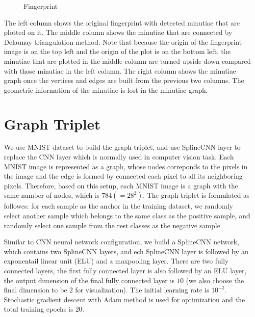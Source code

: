 \documentclass[12pt, a4paper]{article}
\begin{document}
\begin{spacing}{1}
\begin{figure}[!ht]
\begin{minipage}[b]{0.93\linewidth}
{\begin{minipage}[b]{0.27\linewidth}
                \end{minipage}
            }
        \end{minipage}
        \vfill
        \caption{Fingerprint}
        \label{fig:mnt}
    \end{figure}

    The left column shows the original fingerprint with detected minutiae that are plotted on it. The middle column shows the minutiae that are connected by Delaunay triangulation method. Note that because the origin of the fingerprint image is on the top left and the origin of the plot is on the bottom left, the minutiae that are plotted in the middle column are turned upside down compared with those minutiae in the left column. The right column shows the minutiae graph once the vertices and edges are built from the previous two columns. The geometric information of the minutiae is lost in the minutiae graph. 

    \section{Graph Triplet}
    We use MNIST dataset \cite{LecunIEEE1998} to build the graph triplet, and use SplineCNN layer \cite{FeyCVPR2018splinecnn} \cite{FeyICLR2020DGMC} to replace the CNN layer which is normally used in computer vision task. Each MNIST image is represented as a graph, whose nodes correponds to the pixels in the image and the edge is formed by connected each pixel to all its neighboring pixels. Therefore, based on this setup, each MNIST image is a graph with the same number of nodes, which is $784(=28^2)$. The graph triplet is formulated as followes: for each sample as the anchor in the training dataset, we randomly select another sample which belongs to the same class as the positive sample, and randomly select one sample from the rest classes as the negative sample. 
    
    Similar to CNN neural network configuration, we build a SplineCNN network, which contains two SplineCNN layers, and ech SplineCNN layer is followed by an exponentail linear unit (ELU) and a maxpooling layer. There are two fully connected layers, the first fully connected layer is also followed by an ELU layer, the output dimension of the final fully connected layer is $10$ (we also choose the final dimension to be $2$ for visualization). The initial learning rate is $10^{-3}$. Stochastic gradient descent with Adam method is used for optimization and the total training epochs is $20$.


\end{spacing}
\end{document}
